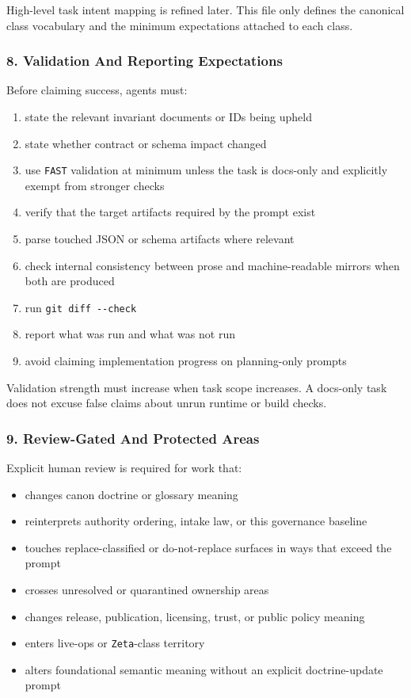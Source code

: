 \documentclass[9pt,a4paper,openany]{book}
\begin{document}
High-\allowbreak{}level task intent mapping is refined later.\allowbreak{} This file only defines the canonical class vocabulary and the minimum expectations attached to each class.\allowbreak{}


\subsubsection{8. Validation And Reporting Expectations}

Before claiming success, agents must:


\begin{enumerate}
\item state the relevant invariant documents or IDs being upheld
\item state whether contract or schema impact changed
\item use \texttt{FAST} validation at minimum unless the task is docs-\allowbreak{}only and explicitly exempt from stronger checks
\item verify that the target artifacts required by the prompt exist
\item parse touched JSON or schema artifacts where relevant
\item check internal consistency between prose and machine-\allowbreak{}readable mirrors when both are produced
\item run \texttt{git diff -\allowbreak{}-\allowbreak{}check}
\item report what was run and what was not run
\item avoid claiming implementation progress on planning-\allowbreak{}only prompts
\end{enumerate}

Validation strength must increase when task scope increases.\allowbreak{} A docs-\allowbreak{}only task does not excuse false claims about unrun runtime or build checks.\allowbreak{}


\subsubsection{9. Review-Gated And Protected Areas}

Explicit human review is required for work that:


\begin{itemize}
\item changes canon doctrine or glossary meaning
\item reinterprets authority ordering, intake law, or this governance baseline
\item touches replace-\allowbreak{}classified or do-\allowbreak{}not-\allowbreak{}replace surfaces in ways that exceed the prompt
\item crosses unresolved or quarantined ownership areas
\item changes release, publication, licensing, trust, or public policy meaning
\item enters live-\allowbreak{}ops or \texttt{Zeta}-\allowbreak{}class territory
\item alters foundational semantic meaning without an explicit doctrine-\allowbreak{}update prompt
\end{itemize}
\end{document}
